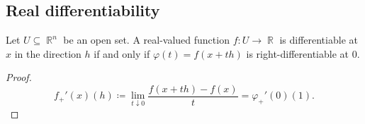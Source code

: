 \subsection{Real differentiability}\label{subsec:real_differentiability}

\begin{proposition}\label{thm:real_valued_differentiability}
  Let \( U \subseteq \BbbR^n \) be an open set. A real-valued function \( f: U \to \BbbR \) is differentiable at \( x \) in the direction \( h \) if and only if \( \varphi(t) = f(x + th) \) is right-differentiable at \( 0 \).
\end{proposition}
\begin{proof}
  \begin{equation*}
    f_+'(x)(h) \coloneqq \lim_{t \downarrow 0} \frac {f(x + th) - f(x)} t = \varphi_+'(0)(1).
  \end{equation*}
\end{proof}

